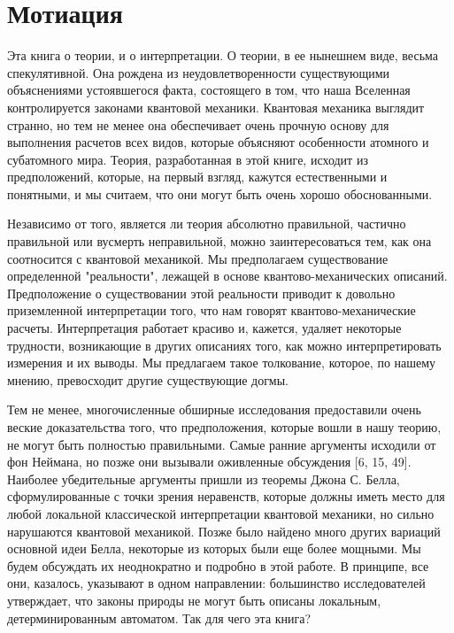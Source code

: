 \documentclass[main.tex]{subfiles}
\begin{document}
\section{Мотиация}\label{ch1}

Эта книга о теории, и о интерпретации. О теории, в ее нынешнем виде, весьма спекулятивной. Она рождена из неудовлетворенности существующими объяснениями устоявшегося факта, состоящего в том, что наша Вселенная контролируется законами квантовой механики. Квантовая механика выглядит странно, но тем не менее она обеспечивает очень прочную основу для выполнения расчетов всех видов, которые объясняют особенности атомного и субатомного мира. Теория, разработанная в этой книге, исходит из предположений, которые, на первый взгляд, кажутся естественными и понятными, и мы считаем, что они могут быть очень хорошо обоснованными. 

Независимо от того, является ли теория абсолютно правильной, частично правильной или вусмерть неправильной, можно заинтересоваться тем, как она соотносится с квантовой механикой. Мы предполагаем существование определенной "реальности", лежащей в основе квантово-механических описаний. Предположение о существовании этой реальности приводит к довольно приземленной интерпретации того, что нам говорят квантово-механические расчеты. Интерпретация работает красиво и, кажется, удаляет некоторые трудности, возникающие в других описаниях того, как можно интерпретировать измерения и их выводы. Мы предлагаем такое толкование, которое, по нашему мнению, превосходит другие существующие догмы. 

Тем не менее, многочисленные обширные исследования предоставили очень веские доказательства того, что предположения, которые вошли в нашу теорию, не могут быть полностью правильными. Самые ранние аргументы исходили от фон Неймана, но позже они вызывали оживленные обсуждения [6, 15, 49]. Наиболее убедительные аргументы пришли из теоремы Джона С. Белла, сформулированные с точки зрения неравенств, которые должны иметь место для любой локальной классической интерпретации квантовой механики, но сильно нарушаются квантовой механикой. Позже было найдено много других вариаций основной идеи Белла, некоторые из которых были еще более мощными. Мы будем обсуждать их неоднократно и подробно в этой работе. В принципе, все они, казалось, указывают в одном направлении: большинство исследователей утверждает, что законы природы не могут быть описаны локальным, детерминированным автоматом. Так для чего эта книга? 
\end{document}
